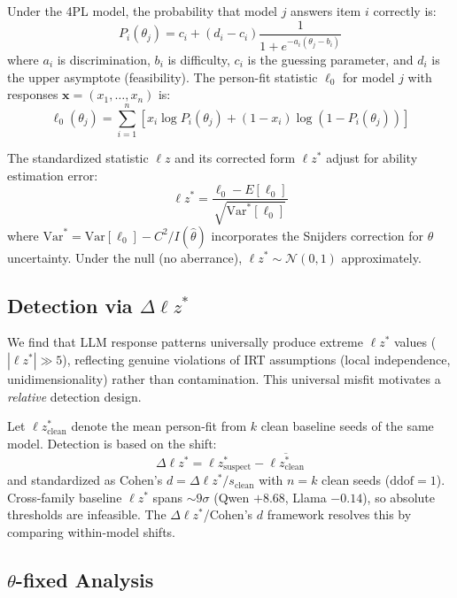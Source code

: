 \documentclass[11pt,a4paper]{article}
\newcommand{\thetafixed}{$\theta$-fixed}
\begin{document}
Under the 4PL model, the probability that model $j$ answers item $i$ correctly is:
\begin{equation}
P_i(\theta_j) = c_i + (d_i - c_i) \frac{1}{1 + e^{-a_i(\theta_j - b_i)}}
\end{equation}
where $a_i$ is discrimination, $b_i$ is difficulty, $c_i$ is the guessing parameter, and $d_i$ is the upper asymptote (feasibility). The person-fit statistic $\ell_0$ for model $j$ with responses $\mathbf{x} = (x_1, \ldots, x_n)$ is:
\begin{equation}
\ell_0(\theta_j) = \sum_{i=1}^{n} \left[ x_i \log P_i(\theta_j) + (1-x_i) \log(1 - P_i(\theta_j)) \right]
\end{equation}

The standardized statistic $\ell z$ and its corrected form $\ell z^*$ \citep{snijders2001lzstar} adjust for ability estimation error:
\begin{equation}
\ell z^* = \frac{\ell_0 - E[\ell_0]}{\sqrt{\text{Var}^*[\ell_0]}}
\end{equation}
where $\text{Var}^* = \text{Var}[\ell_0] - C^2/I(\hat{\theta})$ incorporates the Snijders correction for $\hat{\theta}$ uncertainty. Under the null (no aberrance), $\ell z^* \sim \mathcal{N}(0,1)$ approximately.

\subsection{Detection via $\Delta\ell z^*$}

We find that LLM response patterns universally produce extreme $\ell z^*$ values ($|\ell z^*| \gg 5$), reflecting genuine violations of IRT assumptions (local independence, unidimensionality) rather than contamination. This universal misfit motivates a \emph{relative} detection design.

Let $\ell z^*_{\text{clean}}$ denote the mean person-fit from $k$ clean baseline seeds of the same model. Detection is based on the shift:
\begin{equation}
\Delta\ell z^* = \ell z^*_{\text{suspect}} - \overline{\ell z^*_{\text{clean}}}
\end{equation}
and standardized as Cohen's $d = \Delta\ell z^* / s_{\text{clean}}$ with $n=k$ clean seeds ($\text{ddof}=1$). Cross-family baseline $\ell z^*$ spans ${\sim}9\sigma$ (Qwen $+8.68$, Llama $-0.14$), so absolute thresholds are infeasible. The $\Delta\ell z^*$/Cohen's $d$ framework resolves this by comparing within-model shifts.

\subsection{\thetafixed{} Analysis}
\end{document}
